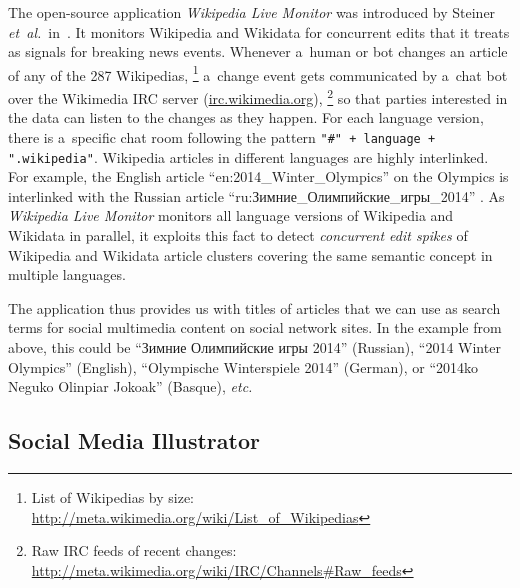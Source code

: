 \documentclass{sig-alternate-somus}
\newcommand{\inlinelistingsize}{\fontsize{8pt}{11pt}}
\let\oldurl\url
\renewcommand{\url}[1]{\inlinelistingsize\oldurl{#1}}
\begin{document}
The open-source application \emph{Wikipedia Live Monitor}
was introduced by Steiner \emph{et~al.}\
in~\cite{steiner2013mjnomore}.
It monitors Wikipedia and Wikidata for concurrent edits
that it treats as signals for breaking news events.
Whenever a~human or bot changes an article
of any of the 287 Wikipedias,%
\footnote{List of Wikipedias by size:
\url{http://meta.wikimedia.org/wiki/List_of_Wikipedias}}
a~change event gets communicated by a~chat bot
over the Wikimedia IRC server (\url{irc.wikimedia.org}),%
\footnote{Raw IRC feeds of recent changes:
\url{http://meta.wikimedia.org/wiki/IRC/Channels\#Raw_feeds}}
so that parties interested in the data
can listen to the changes as they happen.
For each language version, there is
a~specific chat room following the pattern
\texttt{"\#" + language + ".wikipedia"}.
Wikipedia articles in different languages are highly interlinked.
For example, the English article
``en:2014\_Winter\_Olympics''
on the Olympics is interlinked with the Russian article
\selectfont%
``ru:Зимние\_Олимпийские\_игры\_2014''%
\selectfont.
As \emph{Wikipedia Live Monitor} monitors all language versions
of Wikipedia and Wikidata in parallel,
it exploits this fact to detect \emph{concurrent edit spikes}
of Wikipedia and Wikidata article clusters covering
the same semantic concept in multiple languages.

The application thus provides us with titles of articles
that we can use as search terms for social multimedia content
on social network sites.
In the example from above, this could be
\selectfont%
``Зимние Олимпийские игры 2014''%
\selectfont (Russian),
``2014 Winter Olympics'' (English),
``Olympische Winterspiele 2014'' (German),
or ``2014ko Neguko Olinpiar Jokoak'' (Basque), \emph{etc.}

\subsection{Social Media Illustrator}
\end{document}
